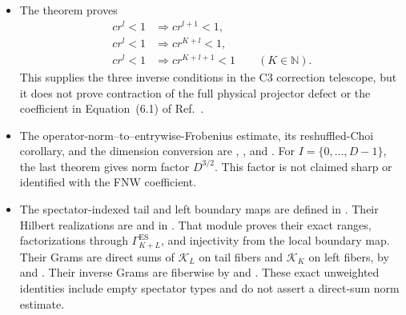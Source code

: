 \documentclass{article}
\providecommand{\Fin}[1]{\{0,\ldots,#1{-}1\}}
\begin{document}
\begin{itemize}
    \item The theorem
           proves
          \begin{align}
              cr^l<1
               & \Longrightarrow cr^{l+1}<1,
              \label{eq:cpgsv21_martingale_overlap_smallness_l_plus_one} \\
              cr^l<1
               & \Longrightarrow cr^{K+l}<1,
              \label{eq:cpgsv21_martingale_overlap_smallness_k_plus_l}   \\
              cr^l<1
               & \Longrightarrow cr^{K+l+1}<1
              \qquad(K\in\mathbb N).
              \label{eq:cpgsv21_martingale_overlap_smallness_k_plus_l_plus_one}
          \end{align}
          This supplies the three inverse conditions in the C3 correction telescope,
          but it does not prove contraction of the full physical projector defect or
          the coefficient in Equation~(6.1) of
          Ref.~\cite{Nachtergaele1996Spectral}.

    \item The operator-norm--to--entrywise-Frobenius estimate, its
          reshuffled-Choi corollary, and the dimension conversion are
          ,
          , and
          . For
          $I=\Fin{D}$, the last theorem gives norm factor $D^{3/2}$. This factor is
          not claimed sharp or identified with the FNW coefficient.

    \item The spectator-indexed tail and left boundary maps are defined in
          . Their Hilbert
          realizations are  and
           in
          . That module
          proves their exact ranges, factorizations through
          $\Gamma_{K+L}^{\mathrm{ES}}$, and injectivity from the local boundary map.
          Their Grams are direct sums of $\mathcal K_L$ on tail fibers and
          $\mathcal K_K$ on left fibers, by
          and
          .
          Their inverse Grams are fiberwise by
          and
          .
          These exact unweighted identities include empty spectator types and do not
          assert a direct-sum norm estimate.


\end{itemize}
\end{document}
